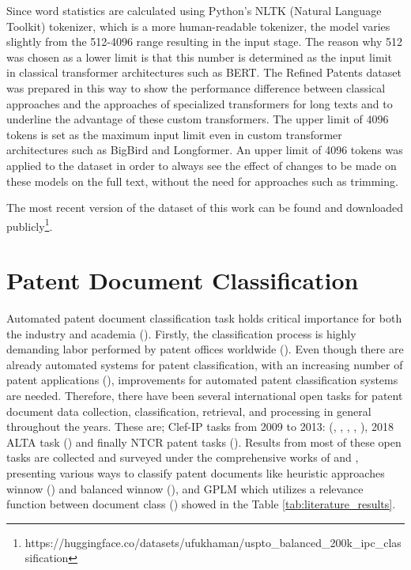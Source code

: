 \documentclass{iyte}
\begin{document}
Since word statistics are calculated using Python's NLTK (Natural Language Toolkit) tokenizer, which is a more human-readable tokenizer, the model varies slightly from the 512-4096 range resulting in the input stage. The reason why 512 was chosen as a lower limit is that this number is determined as the input limit in classical transformer architectures such as BERT. The Refined Patents dataset was prepared in this way to show the performance difference between classical approaches and the approaches of specialized transformers for long texts and to underline the advantage of these custom transformers. The upper limit of 4096 tokens is set as the maximum input limit even in custom transformer architectures such as BigBird and Longformer. An upper limit of 4096 tokens was applied to the dataset in order to always see the effect of changes to be made on these models on the full text, without the need for approaches such as trimming.

The most recent version of the dataset of this work can be found and downloaded publicly\footnote{https://huggingface.co/datasets/ufukhaman/uspto\_balanced\_200k\_ipc\_classification}.

\section{Patent Document Classification}

Automated patent document classification task holds critical importance for both the industry and academia (\citealt{task_CLEF-IP}). Firstly, the classification process is highly demanding labor performed by patent offices worldwide (\citealt{historical_patent_classification}). Even though there are already automated systems for patent classification, with an increasing number of patent applications (\citealt{DeepPatent}), improvements for automated patent classification systems are needed. Therefore, there have been several international open tasks for patent document data collection, classification, retrieval, and processing in general throughout the years. These are; Clef-IP tasks from 2009 to 2013: (\citealt{clef_ip_2009}, \citealt{clef_ip_2010}, \citealt{clef_ip_2011}, \citealt{clef_ip_2012}, \citealt{clef_ip_2013}), 2018 ALTA task (\citealt{task_ATLA_2018}) and finally NTCR patent tasks (\citealt{NTCIR_patent_tasks}). Results from most of these open tasks are collected and surveyed under the comprehensive works of \cite{patent_classification_book_survey} and \cite{patent_task_survey_2019}, presenting various ways to classify patent documents like heuristic approaches winnow (\citealt{lit_verbene_1}) and balanced winnow (\citealt{lit_beney_clef_ip_2010}), and GPLM which utilizes a relevance function between document class (\citealt{lit_aiolli}) showed in the Table \ref{tab:literature_results}.
\end{document}
